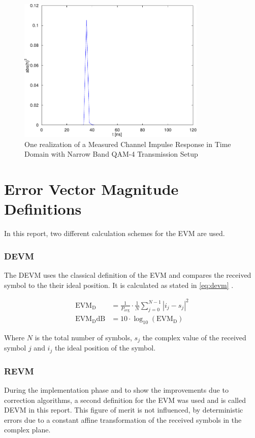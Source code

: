 \begin{figure}[p]
  \centering
  \includegraphics[width=0.8\textwidth]{figures/matlab/res_450_qam4_h}
  \caption{One realization of a Measured Channel Impulse Response in Time Domain
    with Narrow Band \gls{QAM}-4 Transmission Setup}
  \label{fig:res_450_qam4_h}
\end{figure}

\section{Error Vector Magnitude Definitions}
In this report, two different calculation schemes for the \acrfull{EVM}
are used.

\subsubsection{\acrfull{DEVM}}
The \gls{DEVM} uses the classical definition of the \gls{EVM}
and compares the received symbol to the their ideal position.
It is calculated as stated in \eqref{eq:devm} \cite{razavi2011rf}.

\begin{align}
  \text{EVM}_\text{D} &= \frac{1}{P_{\text{avg}}} \cdot \frac{1}{N}
  \sum_{j=0}^{N-1} |i_j - s_j|^2
  \label{eq:devm} \\
  \text{EVM}_\text{D}\text{dB} &= 10 \cdot \log_{10} (\text{EVM}_\text{D})
\end{align}

Where $N$ is the total number of symbols, $s_j$ the complex value of the
received symbol $j$ and $i_j$ the ideal position of the symbol. \\

\subsubsection{\acrfull{REVM}}
During the implementation phase and to show the improvements due to correction
algorithms, a second definition for the \gls{EVM} was used and
is called \gls{DEVM} in this report. This figure of merit is not influenced,
by deterministic errors due to a constant affine transformation of the
received symbols in the complex plane. \\

